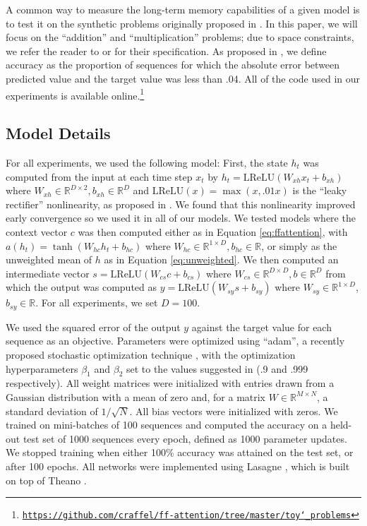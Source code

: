 \documentclass{article} %
\begin{document}
A common way to measure the long-term memory capabilities of a given model is to test it on the synthetic problems originally proposed in \cite{hochreiter1997long}.
In this paper, we will focus on the ``addition'' and ``multiplication'' problems; due to space constraints, we refer the reader to \cite{hochreiter1997long} or \cite{sutskever2013importance} for their specification.
As proposed in \cite{hochreiter1997long}, we define accuracy as the proportion of sequences for which the absolute error between predicted value and the target value was less than .04.
All of the code used in our experiments is available online.\footnote{\href{https://github.com/craffel/ff-attention/tree/master/toy_problems}{\texttt{https://github.com/craffel/ff-attention/tree/master/toy\char`_problems}}}

\subsection{Model Details}

For all experiments, we used the following model:
First, the state $h_t$ was computed from the input at each time step $x_t$ by $h_t = \textrm{LReLU}(W_{xh}x_t + b_{xh})$ where $W_{xh} \in \mathbb{R}^{D \times 2}, b_{xh} \in \mathbb{R}^D$ and $\textrm{LReLU}(x) = \max(x, .01x)$ is the ``leaky rectifier'' nonlinearity, as proposed in \cite{maas2013rectifier}.
We found that this nonlinearity improved early convergence so we used it in all of our models.
We tested models where the context vector $c$ was then computed either as in Equation \ref{eq:ffattention}, with $a(h_t) =\tanh(W_{hc}h_t + b_{hc})$
where $W_{hc} \in \mathbb{R}^{1 \times D}, b_{hc} \in \mathbb{R}$, or simply as the unweighted mean of $h$ as in Equation \ref{eq:unweighted}.
We then computed an intermediate vector $s = \textrm{LReLU}(W_{cs}c + b_{cs})$ where $W_{cs} \in \mathbb{R}^{D \times D}, b \in \mathbb{R}^D$ from which the output was computed as $y = \textrm{LReLU}(W_{sy}s + b_{sy})$ where $W_{sy} \in \mathbb{R}^{1 \times D}$, $b_{sy} \in \mathbb{R}$.
For all experiments, we set $D = 100$.

We used the squared error of the output $y$ against the target value for each sequence as an objective.
Parameters were optimized using ``adam'', a recently proposed stochastic optimization technique \cite{kingma2014adam}, with the optimization hyperparameters $\beta_1$ and $\beta_2$ set to the values suggested in \cite{kingma2014adam} (.9 and .999 respectively).
All weight matrices were initialized with entries drawn from a Gaussian distribution with a mean of zero and, for a matrix $W \in \mathbb{R}^{M \times N}$, a standard deviation of $1/\sqrt{N}$.
All bias vectors were initialized with zeros.
We trained on mini-batches of 100 sequences and computed the accuracy on a held-out test set of 1000 sequences every epoch, defined as 1000 parameter updates.
We stopped training when either 100\% accuracy was attained on the test set, or after 100 epochs.
All networks were implemented using Lasagne \cite{dieleman2015lasagne}, which is built on top of Theano \cite{bastien2012theano,bergstra2010theano}.
\end{document}
